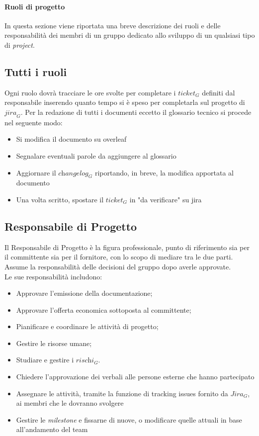 \paragraph{Ruoli di progetto}
In questa sezione viene riportata una breve descrizione dei ruoli e delle responsabilità dei membri di un gruppo dedicato allo sviluppo di un qualsiasi tipo di \textit{project}.
\subsection{Tutti i ruoli}
Ogni ruolo dovrà tracciare le ore svolte per completare i $\textit{ticket}_G$ definiti dal responsabile inserendo quanto tempo si è speso per completarla sul progetto di $\textit{jira}_G$.
Per la redazione di tutti i documenti eccetto il glossario tecnico si procede nel seguente modo:
\begin{itemize}
    \item Si modifica il documento su overleaf
    \item Segnalare eventuali parole da aggiungere al glossario
    \item Aggiornare il $\textit{changelog}_G$ riportando, in breve, la modifica apportata al documento
    \item Una volta scritto, spostare il $\textit{ticket}_G$ in "da verificare" su jira
\end{itemize}
\subsection{Responsabile di Progetto}
Il Responsabile di Progetto è la figura professionale, punto di riferimento sia per il committente sia per il fornitore, con lo scopo di
mediare tra le due parti. Assume la responsabilità delle decisioni del gruppo dopo averle approvate.\\
Le sue responsabilità includono:
\begin{itemize}
    \item Approvare l’emissione della documentazione;
    \item Approvare l’offerta economica sottoposta al committente;
    \item Pianificare e coordinare le attività di progetto;
    \item Gestire le risorse umane;
    \item Studiare e gestire i  $\textit{rischi}_G$.
    \item Chiedere l'approvazione dei verbali alle persone esterne che hanno partecipato
    \item Assegnare le attività, tramite la funzione di tracking issues fornito da $\textit{Jira}_G$, ai membri che le dovranno svolgere
    \item Gestire le \textit{milestone} e fissarne di nuove, o modificare quelle attuali in base all'andamento del team
\end{itemize}
